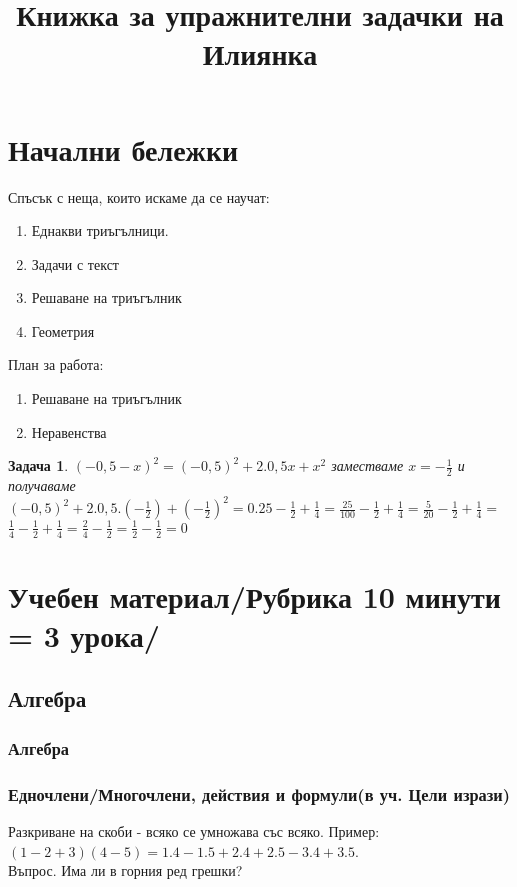 \documentclass{article}
\date{}
\title{Книжка за упражнителни задачки на Илиянка}
\newtheorem{problem}{Задача}
\begin{document}
	
	
	\maketitle
	\tableofcontents
	
	\section{Начални бележки}
	Спъсък с неща, които искаме да се научат:
	\begin{enumerate}
		\item Еднакви триъгълници.
		\item Задачи с текст
		\item Решаване на триъгълник
		\item Геометрия
		
		
	\end{enumerate}
	План за работа:
	\begin{enumerate}
		\item Решаване на триъгълник
		\item Неравенства
	\end{enumerate}
	
	\begin{problem}
		$(-0,5-x)^2 = (-0,5)^2 + 2.0,5x + x^2$ заместваме $x = -\frac{1}{2} $ и получаваме
	 $(-0,5)^2 + 2.0,5.(-\frac{1}{2}) + (-\frac{1}{2})^2 = 0.25 -\frac{1}{2} + \frac{1}{4}= \frac{25}{100}-\frac{1}{2} + \frac{1}{4} = \frac{5}{20}-\frac{1}{2} + \frac{1}{4} =$ \\
	 $\frac{1}{4}-\frac{1}{2} + \frac{1}{4} = \frac{2}{4} - \frac{1}{2}= \frac{1}{2} - \frac{1}{2} = 0 $ 
\end{problem}
	\section{Учебен материал/Рубрика 10 минути = 3 урока/}
	\subsection{Алгебра}
	\subsubsection{Алгебра}
	\subsubsection{Едночлени/Многочлени, действия и формули(в уч. Цели изрази)}
	Разкриване на скоби - всяко се умножава със всяко. Пример:\\
	$(1-2+3)(4-5) = 1.4 - 1.5 + 2.4 + 2.5 - 3.4 + 3.5$. \\
	Въпрос. Има ли в горния ред грешки?\\
	
\end{document}
